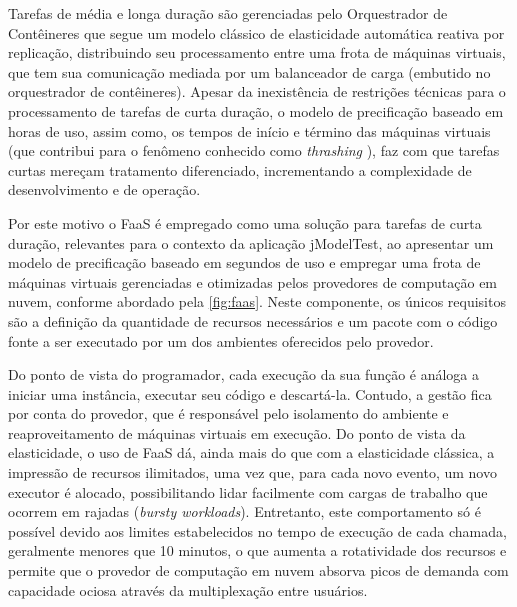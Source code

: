 \documentclass[english,brazilian]{UNISINOSmonografia} %
\begin{document}
Tarefas de média e longa duração são gerenciadas pelo Orquestrador de Contêineres que segue um modelo clássico de elasticidade automática reativa por replicação, distribuindo seu processamento entre uma frota de máquinas virtuais, que tem sua comunicação mediada por um balanceador de carga (embutido no orquestrador de contêineres).
Apesar da inexistência de restrições técnicas para o processamento de tarefas de curta duração, o modelo de precificação baseado em horas de uso, assim como, os tempos de início e término das máquinas virtuais (que contribui para o fenômeno conhecido como \textit{thrashing} \cite{Bersani2014}), faz com que tarefas curtas mereçam tratamento diferenciado, incrementando a complexidade de desenvolvimento e de operação.


Por este motivo o FaaS é empregado como uma solução para tarefas de curta duração, relevantes para o contexto da aplicação jModelTest, ao apresentar um modelo de precificação baseado em segundos de uso e empregar uma frota de máquinas virtuais gerenciadas e otimizadas pelos provedores de computação em nuvem, conforme abordado pela \autoref{fig:faas}.
Neste componente, os únicos requisitos são a definição da quantidade de recursos necessários e um pacote com o código fonte a ser executado por um dos ambientes oferecidos pelo provedor.


Do ponto de vista do programador, cada execução da sua função é análoga a iniciar uma instância, executar seu código e descartá-la.
Contudo, a gestão fica por conta do provedor, que é responsável pelo isolamento do ambiente e reaproveitamento de máquinas virtuais em execução.
Do ponto de vista da elasticidade, o uso de FaaS dá, ainda mais do que com a elasticidade clássica, a impressão de recursos ilimitados, uma vez que, para cada novo evento, um novo executor é alocado, possibilitando lidar facilmente com cargas de trabalho que ocorrem em rajadas (\textit{bursty workloads}).
Entretanto, este comportamento só é possível devido aos limites estabelecidos no tempo de execução de cada chamada, geralmente menores que 10 minutos, o que aumenta a rotatividade dos recursos e permite que o provedor de computação em nuvem absorva picos de demanda com capacidade ociosa através da multiplexação entre usuários.
\end{document}
